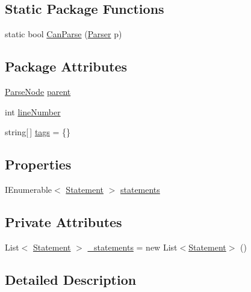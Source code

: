 \subsection*{Static Package Functions}
\begin{DoxyCompactItemize}
\item 
static bool \hyperlink{a00022_a7fa97243e2a807c2255988547d31cac7}{Can\-Parse} (\hyperlink{a00121}{Parser} p)
\end{DoxyCompactItemize}
\subsection*{Package Attributes}
\begin{DoxyCompactItemize}
\item 
\hyperlink{a00120}{Parse\-Node} \hyperlink{a00120_af313a82103fcc2ff5a177dbb06b92f7b}{parent}
\item 
int \hyperlink{a00120_a18b493382de0fde5b4299c1bd2250075}{line\-Number}
\item 
string\mbox{[}$\,$\mbox{]} \hyperlink{a00120_a58b3a15788fd2d4127d73619dc6d04ae}{tags} = \{\}
\end{DoxyCompactItemize}
\subsection*{Properties}
\begin{DoxyCompactItemize}
\item 
I\-Enumerable$<$ \hyperlink{a00140}{Statement} $>$ \hyperlink{a00022_a42e3d555bbd5ecbdf61c45ad715be7e1}{statements}
\end{DoxyCompactItemize}
\subsection*{Private Attributes}
\begin{DoxyCompactItemize}
\item 
List$<$ \hyperlink{a00140}{Statement} $>$ \hyperlink{a00022_ad79f9582e55ec75b68fd72ffcae0f41b}{\-\_\-statements} = new List$<$\hyperlink{a00140}{Statement}$>$ ()
\end{DoxyCompactItemize}


\subsection{Detailed Description}


